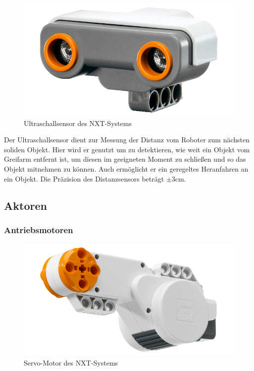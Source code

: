 \begin{figure}[h]
\centering
\includegraphics[width=\textwidth/3]{Bilder/Robot/distance_sensor}
\caption{Ultraschallsensor des NXT-Systems}
\label{fig:distanceSensor}
\end{figure}

Der Ultraschallsensor dient zur Messung der Distanz vom Roboter zum nächsten soliden Objekt. Hier wird er genutzt um zu detektieren, wie weit ein Objekt vom Greifarm entfernt ist, um diesen im geeigneten Moment zu schließen und so das Objekt mitnehmen zu können. Auch ermöglicht er ein geregeltes Heranfahren an ein Objekt. Die Präzision des Distanzsensors beträgt $\pm$3cm.

\subsection{Aktoren}

\subsubsection{Antriebsmotoren}

\begin{figure}[h]
\centering
\includegraphics[width=\textwidth/3]{Bilder/Robot/motor}
\caption{Servo-Motor des NXT-Systems}
\label{fig:motor}
\end{figure}

